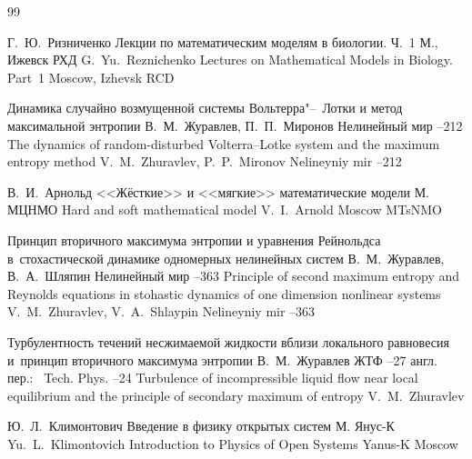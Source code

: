 \begin{thebibliography}{99}

\by Г.~Ю.~Ризниченко 
\book Лекции по математическим моделям в биологии. Ч.~1 
\publaddr М., Ижевск 
\publ РХД 
\misctransl
\by G.~Yu.~Reznichenko
\book Lectures on Mathematical Models in Biology. Part~1
\publaddr Moscow, Izhevsk
\publ RCD


\paper  Динамика случайно возмущенной системы Вольтерра"--~Лотки и метод максимальной энтропии 
\by В.~М.~Журавлев, П.~П.~Миронов 
\jour Нелинейный мир 
--212
\misctransl
\paper The dynamics of random-disturbed Volterra--Lotke system and the maximum entropy method
\by V.~M.~Zhuravlev, P.~P.~Mironov
\jour Nelineyniy mir 
--212


\by В.~И.~Арнольд 
\book <<Жёсткие>> и <<мягкие>> математические модели 
\publaddr М. 
\publ МЦНМО 
\misctransl
\book Hard and soft mathematical model
\by V.~I.~Arnold
\publaddr Moscow
\publ MTsNMO

\paper Принцип вторичного максимума энтропии и уравнения Рейнольдса в~стохастической динамике одномерных нелинейных систем
\by В.~М.~Журавлев, В.~А.~Шляпин 
\jour Нелинейный мир 
--363
\misctransl
\paper Principle of second maximum entropy and Reynolds equations in stohastic dynamics of one dimension nonlinear systems
\by V.~M.~Zhuravlev, V.~A.~Shlaypin
\jour Nelineyniy mir 
--363

\paper Турбулентность течений несжимаемой жидкости вблизи локального равновесия и~принцип вторичного максимума энтропии 
\by В.~М.~Журавлев 
\jour ЖТФ 
--27
\transl англ. пер.:~
\jour Tech. Phys.
--24
\paper Turbulence of incompressible liquid flow near local equilibrium and the principle of secondary maximum of entropy
\by V.~M.~Zhuravlev 

\by Ю.~Л.~Климонтович 
\book Введение в физику открытых систем 
\publaddr М. 
\publ Янус-К
\misctransl
\by Yu.~L.~Klimontovich
\book Introduction to Physics of Open Systems 
\publ Yanus-K
\publaddr Moscow


\end{thebibliography}
